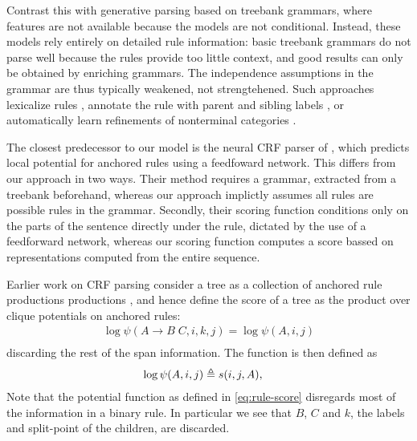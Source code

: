 Contrast this with generative parsing based on treebank grammars, where features are not available because the models are not conditional. Instead, these models rely entirely on detailed rule information: basic treebank grammars do not parse well because the rules provide too little context, and good results can only be obtained by enriching grammars. The independence assumptions in the grammar are thus typically weakened, not strengtehened. Such approaches lexicalize rules \citep{collins2003head}, annotate the rule with parent and sibling labels \citep{klein2003accurate}, or automatically learn refinements of nonterminal categories \citep{petrov2006learning}.

The closest predecessor to our model is the neural CRF parser of \citet{klein2015crf}, which predicts local potential for anchored rules using a feedfoward network. This differs from our approach in two ways. Their method requires a grammar, extracted from a treebank beforehand, whereas our approach implictly assumes all rules are possible rules in the grammar. Secondly, their scoring function conditions only on the parts of the sentence directly under the rule, dictated by the use of a feedforward network, whereas our scoring function computes a score bassed on representations computed from the entire sequence.

Earlier work on CRF parsing consider a tree as a collection of anchored rule productions productions \cite{finkel2008crf,klein2015crf}, and hence define the score of a tree as the product over clique potentials on anchored rules:
\begin{align}
  \log\psi(A \to B \;C, i, k, j) = \log\psi(A, i, j)\\
\end{align}
discarding the rest of the span information. The function is then defined as
\begin{align}
  \label{eq:span-score}
  \log\psi(A, i, j) &\triangleq s(i, j, A),
\end{align}
Note that the potential function as defined in \ref{eq:rule-score} disregards most of the information in a binary rule. In particular we see that $B$, $C$ and $k$, the labels and split-point of the children, are discarded.
